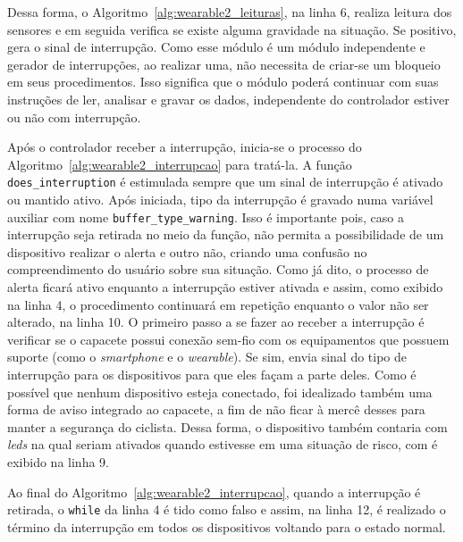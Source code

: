          Dessa forma, o Algoritmo~\ref{alg:wearable2_leituras}, na linha 6, realiza leitura dos sensores e em seguida verifica se existe alguma gravidade na situação.
         Se positivo, gera o sinal de interrupção.
         Como esse módulo é um módulo independente e gerador de interrupções, ao realizar uma, não necessita de criar-se um bloqueio em seus procedimentos. 
         Isso significa que o módulo poderá continuar com suas instruções de ler, analisar e gravar os dados, independente do controlador estiver ou não com interrupção.
         
         Após o controlador receber a interrupção, inicia-se o processo do Algoritmo~\ref{alg:wearable2_interrupcao} para tratá-la.
         A função \texttt{does\_interruption} é estimulada sempre que um sinal de interrupção é ativado ou mantido ativo.
         Após iniciada, tipo da interrupção é gravado numa variável auxiliar com nome \texttt{buffer\_type\_warning}.
         Isso é importante pois, caso a interrupção seja retirada no meio da função, não permita a possibilidade de um dispositivo realizar o alerta e outro não, criando uma confusão no compreendimento do usuário sobre sua situação.
         Como já dito, o processo de alerta ficará ativo enquanto a interrupção estiver ativada e assim, como exibido na linha 4, o procedimento continuará em repetição enquanto o valor não ser alterado, na linha 10.
         O primeiro passo a se fazer ao receber a interrupção é verificar se o capacete possui conexão sem-fio com os equipamentos que possuem suporte (como o \textit{smartphone} e o \textit{wearable}).
         Se sim, envia sinal do tipo de interrupção para os dispositivos para que eles façam a parte deles.
         Como é possível que nenhum dispositivo esteja conectado, foi idealizado também uma forma de aviso integrado ao capacete, a fim de não ficar  à mercê desses para manter a segurança do ciclista.
         Dessa forma, o dispositivo também contaria com \textit{leds} na qual seriam ativados quando estivesse em uma situação de risco, com é exibido na linha 9.
         
         Ao final do Algoritmo~\ref{alg:wearable2_interrupcao}, quando a interrupção é retirada, o \texttt{while} da linha 4 é tido como falso e assim, na linha 12, é realizado o término da interrupção em todos os dispositivos voltando para o estado normal.


